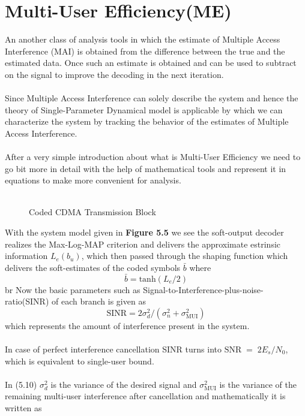 \section{Multi-User Efficiency(ME)}
An another class of analysis tools in which the estimate of Multiple Access Interference (MAI) is obtained from the difference between the true and the estimated data. Once such an estimate is obtained and can be used to subtract on the signal to improve the decoding in the next iteration.\\ \\
Since Multiple Access Interference can solely describe the system and hence the theory of Single-Parameter Dynamical model is applicable by which we can characterize the system by tracking the behavior of the estimates of Multiple Access Interference.\\ \\
After a very simple introduction about what is Multi-User Efficiency we need to go bit more in detail with the help of mathematical tools and represent it in equations to make more convenient for analysis. \\ \\
\begin{figure}[htb]
\centerline{  }
\caption{Coded CDMA Transmission Block}
\end{figure}
With the system model given in \textbf{Figure 5.5} we see the soft-output decoder realizes the Max-Log-MAP criterion and delivers the approximate estrinsic information $L_e(b_u)$, which then passed through the shaping function which delivers the soft-estimates of the coded symbols $\bar{b}$ where
\begin{equation}
\bar{b}=\mathrm{tanh}(L_e/2)
\end{equation}br
Now the basic parameters such as Signal-to-Interference-plus-noise-ratio(SINR) of each branch is given as
\begin{equation}
\mathrm{SINR}=2\sigma_d^2/(\sigma_n^2+\sigma_{\mathrm{MUI}}^2)
\end{equation}
which represents the amount of interference present in the system.\\ \\
In case of perfect interference cancellation SINR turns into $\mathrm{SNR}\;=\;2E_s/N_0$, which is equivalent to single-user bound.\\ \\
In (5.10) $\sigma_d^2$ is the variance of the desired signal and $\sigma_{\mathrm{MUI}}^2$ is the variance of the remaining multi-user interference after cancellation and mathematically it is written as
